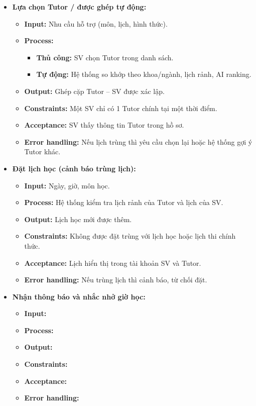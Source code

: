 \begin{itemize}
    \item \textbf{Lựa chọn Tutor / được ghép tự động:}
    \begin{itemize}
        \item \textbf{Input:} Nhu cầu hỗ trợ (môn, lịch, hình thức).
        \item \textbf{Process:} 
        \begin{itemize}
            \item \textbf{Thủ công:} SV chọn Tutor trong danh sách.
            \item \textbf{Tự động: } Hệ thống so khớp theo khoa/ngành, lịch rảnh, AI ranking.
        \end{itemize}
        \item \textbf{Output:} Ghép cặp Tutor – SV được xác lập.
        \item \textbf{Constraints:} Một SV chỉ có 1 Tutor chính tại một thời điểm.
        \item \textbf{Acceptance:} SV thấy thông tin Tutor trong hồ sơ.
        \item \textbf{Error handling:} Nếu lịch trùng thì yêu cầu chọn lại hoặc hệ thống gợi ý Tutor khác.
    \end{itemize}

    \item \textbf{Đặt lịch học (cảnh báo trùng lịch):}
    \begin{itemize}
        \item \textbf{Input:} Ngày, giờ, môn học.
        \item \textbf{Process:} Hệ thống kiểm tra lịch rảnh của Tutor và lịch của SV.
        \item \textbf{Output:} Lịch học mới được thêm.
        \item \textbf{Constraints:} Không được đặt trùng với lịch học hoặc lịch thi chính thức.
        \item \textbf{Acceptance:} Lịch hiển thị trong tài khoản SV và Tutor.
        \item \textbf{Error handling:} Nếu trùng lịch thì cảnh báo, từ chối đặt.
    \end{itemize}

    \item \textbf{Nhận thông báo và nhắc nhở giờ học:}
    \begin{itemize}
        \item \textbf{Input:}
        \item \textbf{Process:}
        \item \textbf{Output:}
        \item \textbf{Constraints:}
        \item \textbf{Acceptance:}
        \item \textbf{Error handling:}
    \end{itemize}


\end{itemize}
